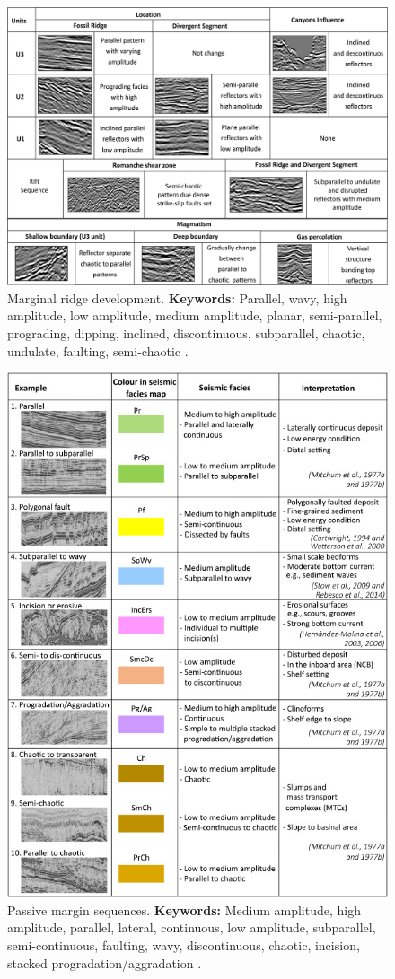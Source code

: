 \begin{figure}[h!]
    \centering
    \includegraphics[width=0.75\linewidth]{Figures/0.3Seismic/Andrade2018_trace_1.png}
    \caption[Marginal ridge development.]{Marginal ridge development. \textbf{Keywords: } Parallel, wavy, high amplitude, low amplitude, medium amplitude, planar, semi-parallel, prograding, dipping, inclined, discontinuous, subparallel, chaotic, undulate, faulting, semi-chaotic \citep{Andrade2018}.}
    \label{fig:Andrade2018-1}
\end{figure}

\begin{figure}[h!]
    \centering
    \includegraphics[width=0.9\linewidth]{Figures/0.3Seismic/Winata2023-1.jpg}
    \caption[Passive margin sequences.]{Passive margin sequences. \textbf{Keywords: } Medium amplitude, high amplitude, parallel, lateral, continuous, low amplitude, subparallel, semi-continuous, faulting, wavy, discontinuous, chaotic, incision, stacked progradation/aggradation \citep{winata2023}.}
    \label{fig:Winata2023-1}
\end{figure}


